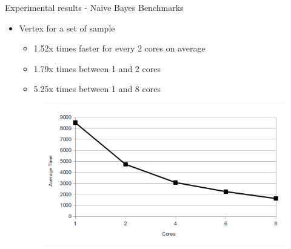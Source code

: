 \documentclass{beamer}
\begin{document}
\begin{frame}{Experimental results - Naive Bayes Benchmarks}

\begin{itemize}

\item{Vertex for a set of sample}

\begin{itemize}
\item 1.52x times faster for every 2 cores on average
\item 1.79x times between 1 and 2 cores
\item 5.25x times between 1 and 8 cores
\end{itemize}

\begin{figure}[!htb]
  \centering
  \includegraphics[scale=0.35]{naivebayes_plot.png}
  \label{fig:naive_plot}
\end{figure}

\end{itemize}

\end{frame}

\end{document}
